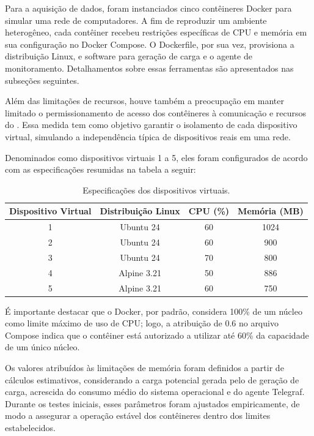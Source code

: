 Para a aquisição de dados, foram instanciados cinco contêineres Docker para simular uma rede de computadores. A fim de reproduzir um ambiente heterogêneo, cada contêiner recebeu restrições específicas de CPU e memória em sua configuração no Docker Compose. O Dockerfile, por sua vez, provisiona a distribuição Linux,  e software para geração de carga e o agente de monitoramento. Detalhamentos sobre essas ferramentas são apresentados nas subseções seguintes.

Além das limitações de recursos, houve também a preocupação em manter limitado o permissionamento de acesso dos contêineres à comunicação e recursos do . Essa medida tem como objetivo garantir o isolamento de cada dispositivo virtual, simulando a independência típica de dispositivos reais em uma rede.

Denominados como dispositivos virtuais 1 a 5, eles foram configurados de acordo com as especificações resumidas na tabela a seguir:

\begin{table}[h]
\centering
\caption{Especificações dos dispositivos virtuais.}
\label{tab:EspecificaçõesDispositivosVirtuais}
\begin{tabular}{c c c c}
\hline
\textbf{Dispositivo Virtual} & \textbf{Distribuição Linux} & \textbf{CPU (\%)} & \textbf{Memória (MB)} \\
\hline
1 & Ubuntu 24 & 60 & 1024 \\
2 & Ubuntu 24 & 60 & 900 \\
3 & Ubuntu 24 & 70 & 800 \\
4 & Alpine 3.21 & 50 & 886 \\
5 & Alpine 3.21 & 60 & 750 \\
\hline
\end{tabular}
\end{table}

É importante destacar que o Docker, por padrão, considera 100\% de um núcleo como limite máximo de uso de CPU; logo, a atribuição de 0.6 no arquivo Compose indica que o contêiner está autorizado a utilizar até 60\% da capacidade de um único núcleo.

Os valores atribuídos às limitações de memória foram definidos a partir de cálculos estimativos, considerando a carga potencial gerada pelo  de geração de carga, acrescida do consumo médio do sistema operacional e do agente Telegraf. Durante os testes iniciais, esses parâmetros foram ajustados empiricamente, de modo a assegurar a operação estável dos contêineres dentro dos limites estabelecidos.

